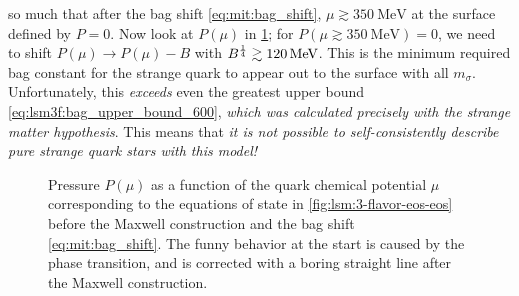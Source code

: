 so much that after the bag shift \eqref{eq:mit:bag_shift},
$\mu \gtrsim \SI{350}{\mega\electronvolt}$ at the surface defined by $P=0$.
Now look at $P(\mu)$ in \cref{fig:lsm:3-flavor-pressure};
for $P(\mu \gtrsim \SI{350}{\mega\electronvolt})=0$, we need to shift $P(\mu) \rightarrow P(\mu) - B$
with $\smash{B^\frac14} \gtrsim \SI{120}{\mega\electronvolt}$.
This is the minimum required bag constant for the strange quark to appear out to the surface with all $m_\sigma$.
Unfortunately, this \emph{exceeds} even the greatest upper bound \eqref{eq:lsm3f:bag_upper_bound_600},
\emph{which was calculated precisely with the strange matter hypothesis}.
This means that \emph{it is not possible to self-consistently describe pure strange quark stars with this model!}

\begin{figure}[b!]
\centering
{}
\caption{\label{fig:lsm:3-flavor-pressure}%
	Pressure $P(\mu)$ as a function of the quark chemical potential $\mu$
	corresponding to the equations of state in \cref{fig:lsm:3-flavor-eos-eos}
	before the Maxwell construction and the bag shift \eqref{eq:mit:bag_shift}.
	The funny behavior at the start is caused by the phase transition,
	and is corrected with a boring straight line after the Maxwell construction.
}
\end{figure}

